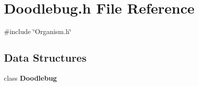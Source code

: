 \section{Doodlebug.\+h File Reference}
\label{Doodlebug_8h}
{\ttfamily \#include \char`\"{}Organism.\+h\char`\"{}}\newline
\subsection*{Data Structures}
\begin{DoxyCompactItemize}
\item 
class \textbf{ Doodlebug}
\end{DoxyCompactItemize}
